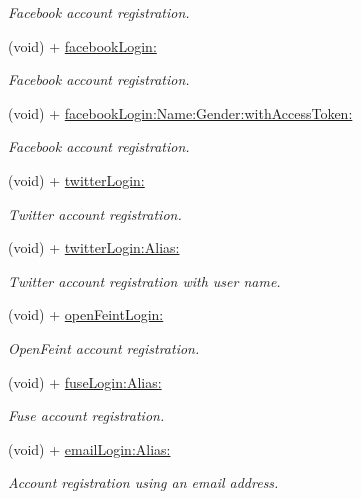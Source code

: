 \begin{DoxyCompactItemize}
\begin{DoxyCompactList}\small\item\em Facebook account registration. \end{DoxyCompactList}\item 
(void) + \hyperlink{interface_fuse_a_p_i_a04c181e3ec49e81ba081a5041df412f6}{facebook\+Login\+:}
\begin{DoxyCompactList}\small\item\em Facebook account registration. \end{DoxyCompactList}\item 
(void) + \hyperlink{interface_fuse_a_p_i_a38487be821059910b1b939d818cd0e9f}{facebook\+Login\+:\+Name\+:\+Gender\+:with\+Access\+Token\+:}
\begin{DoxyCompactList}\small\item\em Facebook account registration. \end{DoxyCompactList}\item 
(void) + \hyperlink{interface_fuse_a_p_i_add5138c113d6e4c1201f70bf8b84eb02}{twitter\+Login\+:}
\begin{DoxyCompactList}\small\item\em Twitter account registration. \end{DoxyCompactList}\item 
(void) + \hyperlink{interface_fuse_a_p_i_a48950b5880ce336cc601a752bcda1a3a}{twitter\+Login\+:\+Alias\+:}
\begin{DoxyCompactList}\small\item\em Twitter account registration with user name. \end{DoxyCompactList}\item 
(void) + \hyperlink{interface_fuse_a_p_i_ae7db839fcdcf674aa1e456a16655e614}{open\+Feint\+Login\+:}
\begin{DoxyCompactList}\small\item\em Open\+Feint account registration. \end{DoxyCompactList}\item 
(void) + \hyperlink{interface_fuse_a_p_i_af7b69ec93b7a26b8512d730db9383511}{fuse\+Login\+:\+Alias\+:}
\begin{DoxyCompactList}\small\item\em Fuse account registration. \end{DoxyCompactList}\item 
(void) + \hyperlink{interface_fuse_a_p_i_a6b16a24e8cb2fdd04b8be9e501259135}{email\+Login\+:\+Alias\+:}
\begin{DoxyCompactList}\small\item\em Account registration using an email address. \end{DoxyCompactList}\item 

\end{DoxyCompactItemize}
